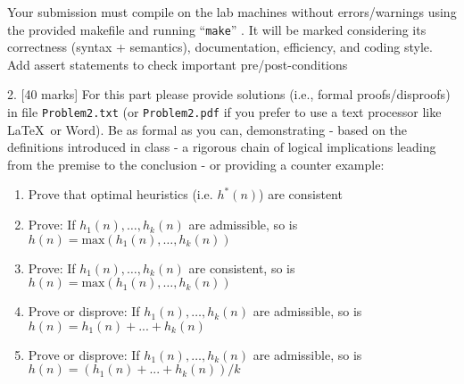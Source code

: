 \documentclass[a4paper,11pt]{article}
\begin{document}
\bigskip 

Your submission must compile on the lab machines without errors/warnings using
the provided makefile and running ``\texttt{make}'' . It will be marked considering its
correctness (syntax + semantics), documentation, efficiency, and coding
style. Add assert statements to check important pre/post-conditions

\linerule

\bigskip

2. [40 marks] 
For this part please provide solutions (i.e., formal proofs/disproofs) in file
\texttt{Problem2.txt} (or \texttt{Problem2.pdf} if you prefer to use a text processor like \LaTeX \ 
or Word). Be as formal as you can, demonstrating - based on the definitions
introduced in class - a rigorous chain of logical implications leading from
the premise to the conclusion - or providing a counter example:

\begin{enumerate}[label=(\alph*)]
    \item Prove that optimal heuristics (i.e. $h^*(n)$) are consistent
    \item Prove: If $h_1(n), \dots, h_k(n)$ are admissible, so is $h(n) = \text{max}(h_1(n), \dots, h_k(n))$
    \item Prove: If $h_1(n), \dots, h_k(n)$ are consistent, so is $h(n) = \text{max}(h_1(n), \dots, h_k(n))$
    \item Prove or disprove: If $h_1(n), \dots, h_k(n)$ are admissible, so is $h(n) = h_1(n) + ... + h_k(n)$
    \item Prove or disprove: If $h_1(n), \dots, h_k(n)$ are admissible, so is $h(n) = (h_1(n) + ... + h_k(n))/k$
\end{enumerate}
\end{document}

